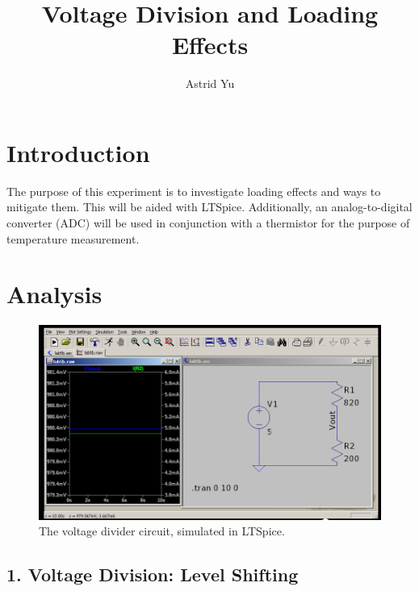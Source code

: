 \documentclass[12pt]{article}
\author{Astrid Yu}
\title{Voltage Division and Loading Effects}
\begin{document}
\maketitle

\section*{Introduction}

The purpose of this experiment is to investigate loading effects and ways 
to mitigate them. This will be aided with LTSpice. Additionally, an 
analog-to-digital converter (ADC) will be used in conjunction with a 
thermistor for the purpose of temperature measurement. 

\section*{Analysis}

\begin{figure}[]
    \centering
    \includegraphics[width=0.9\linewidth]{lab2.png}
    \caption{The voltage divider circuit, simulated in LTSpice.}
    \label{fig:simcircuit}
\end{figure}

\subsection*{1. Voltage Division: Level Shifting}
\end{document}
